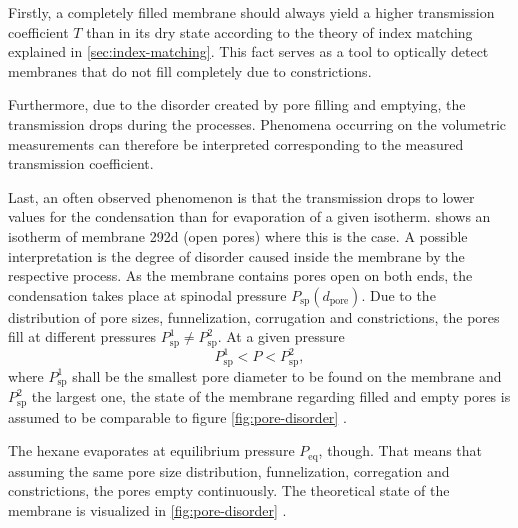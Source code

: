 \documentclass[../thesis.tex]{subfiles}
\begin{document}
                Firstly, a completely filled membrane should always yield a higher transmission coefficient $T$ than in its dry state according to the theory of index matching explained in \cref{sec:index-matching}. This fact serves as a tool to optically detect membranes that do not fill completely due to constrictions.

                Furthermore, due to the disorder created by pore filling and emptying, the transmission drops during the processes. Phenomena occurring on the volumetric measurements can therefore be interpreted corresponding to the measured transmission coefficient.

                Last, an often observed phenomenon is that the transmission drops to lower values for the condensation than for evaporation of a given isotherm.  shows an isotherm of membrane 292d (open pores) where this is the case. A possible interpretation is the degree of disorder caused inside the membrane by the respective process. As the membrane contains pores open on both ends, the condensation takes place at spinodal pressure $P_\mathrm{sp}(d_\mathrm{pore})$. Due to the distribution of pore sizes, funnelization, corrugation and constrictions, the pores fill at different pressures $P_\mathrm{sp}^1 \neq P_\mathrm{sp}^2$. At a given pressure
                \begin{equation*}
                    P_\mathrm{sp}^1 < P < P_\mathrm{sp}^2,
                \end{equation*}
                where $P_\mathrm{sp}^1$ shall be the smallest pore diameter to be found on the membrane and $P_\mathrm{sp}^2$ the largest one, the state of the me{}mbrane regarding filled and empty pores is assumed to be comparable to figure \cref{fig:pore-disorder} \protect{}.

                The hexane evaporates at equilibrium pressure $P_\mathrm{eq}$, though. That means that assuming the same pore size distribution, funnelization, corregation and constrictions, the pores empty continuously. The theoretical state of the membrane is visualized in \cref{fig:pore-disorder} \protect{}.
                \medskip
\end{document}
